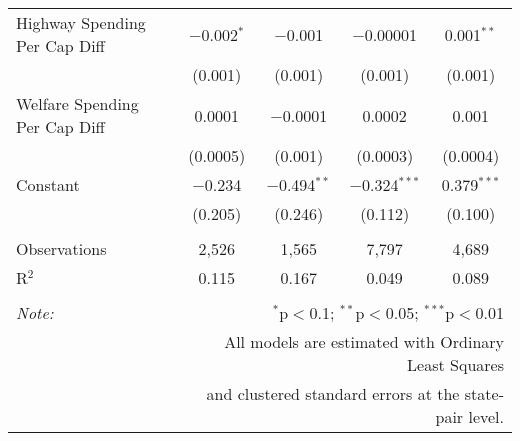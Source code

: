 \begin{table}[!htbp]
\begin{tabular}{@{\extracolsep{5pt}}lcccc}
  Highway Spending Per Cap Diff & $-$0.002$^{*}$ & $-$0.001 & $-$0.00001 & 0.001$^{**}$ \\ 
  & (0.001) & (0.001) & (0.001) & (0.001) \\ 
  Welfare Spending Per Cap Diff & 0.0001 & $-$0.0001 & 0.0002 & 0.001 \\ 
  & (0.0005) & (0.001) & (0.0003) & (0.0004) \\ 
  Constant & $-$0.234 & $-$0.494$^{**}$ & $-$0.324$^{***}$ & 0.379$^{***}$ \\ 
  & (0.205) & (0.246) & (0.112) & (0.100) \\ 
 \hline \\[-1.8ex] 
Observations & 2,526 & 1,565 & 7,797 & 4,689 \\ 
R$^{2}$ & 0.115 & 0.167 & 0.049 & 0.089 \\ 
\hline 
\hline \\[-1.8ex] 
\textit{Note:}  & \multicolumn{4}{r}{$^{*}$p$<$0.1; $^{**}$p$<$0.05; $^{***}$p$<$0.01} \\ 
 & \multicolumn{4}{r}{All models are estimated with Ordinary Least Squares} \\ 
 & \multicolumn{4}{r}{and clustered standard errors at the state-pair level.} \\ 
\end{tabular} 
\end{table} 
